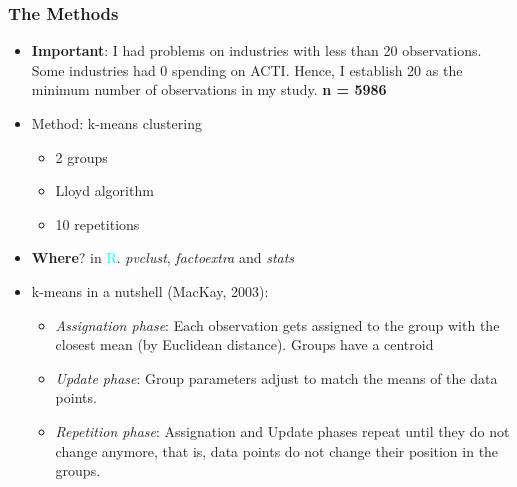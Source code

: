 \documentclass{beamer}
\begin{document}
	\begin{frame}[allowframebreaks]
		\frametitle{The Methods}
		\begin{itemize}
		\item \textbf{Important}: I had problems on industries with less than 20 observations. Some industries had 0 spending on ACTI. Hence, I establish 20 as the minimum number of observations in my study. \textbf{n = 5986}
		\pagebreak
		\item Method: k-means clustering
		\begin{itemize}
			\item 2 groups
			\item Lloyd algorithm
			\item 10 repetitions
		\end{itemize}
		\item \textbf{Where}? in \textcolor{cyan}{R}. \textit{pvclust}, \textit{factoextra} and \textit{stats}
		\pagebreak
		\item k-means in a nutshell (MacKay, 2003):
		\begin{itemize}
			\item \textit{Assignation phase}: Each observation gets assigned to the group with the closest mean (by Euclidean distance). Groups have a centroid
			\item \textit{Update phase}: Group parameters adjust to match the means of the data points.
			\item \textit{Repetition phase}: Assignation and Update phases repeat until they do not change anymore, that is, data points do not change their position in the groups.
		\end{itemize}
		\end{itemize}
	\end{frame}
\end{document}
